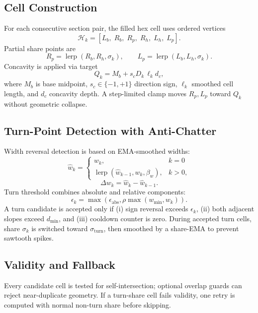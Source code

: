 \documentclass[journal]{IEEEtran}
\begin{document}
\subsection{Cell Construction}
For each consecutive section pair, the filled hex cell uses ordered vertices
\begin{equation}
\mathcal{H}_k = [L_b,\;R_b,\;R_p,\;R_h,\;L_h,\;L_p].
\end{equation}
Partial share points are
\begin{equation}
R_p=\operatorname{lerp}(R_b,R_h,\sigma_k),\qquad
L_p=\operatorname{lerp}(L_b,L_h,\sigma_k).
\end{equation}
Concavity is applied via target
\begin{equation}
Q_k=M_b + s_c D_k \,\ell_k d_c,
\end{equation}
where \(M_b\) is base midpoint, \(s_c\in\{-1,+1\}\) direction sign, \(\ell_k\) smoothed cell length, and \(d_c\) concavity depth. A step-limited clamp moves \(R_p,L_p\) toward \(Q_k\) without geometric collapse.

\subsection{Turn-Point Detection with Anti-Chatter}
Width reversal detection is based on EMA-smoothed widths:
\begin{equation}
\hat{w}_k=
\begin{cases}
w_k, & k=0 \\
\operatorname{lerp}(\hat{w}_{k-1}, w_k,\beta_w), & k>0,
\end{cases}
\end{equation}
\begin{equation}
\Delta w_k = \hat{w}_k - \hat{w}_{k-1}.
\end{equation}
Turn threshold combines absolute and relative components:
\begin{equation}
\epsilon_k=\max\!\left(\epsilon_{\text{abs}},\rho\max(w_{\min},w_k)\right).
\end{equation}
A turn candidate is accepted only if (i) sign reversal exceeds \(\epsilon_k\), (ii) both adjacent slopes exceed \(d_{\min}\), and (iii) cooldown counter is zero. During accepted turn cells, share \(\sigma_k\) is switched toward \(\sigma_{\text{turn}}\), then smoothed by a share-EMA to prevent sawtooth spikes.

\subsection{Validity and Fallback}
Every candidate cell is tested for self-intersection; optional overlap guards can reject near-duplicate geometry. If a turn-share cell fails validity, one retry is computed with normal non-turn share before skipping.
\end{document}
